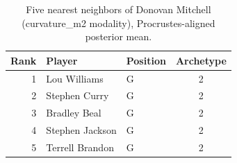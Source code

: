 \begin{table}[htbp]
  \centering\small
  \begin{tabular}{rllc}
    \toprule
    Rank & Player & Position & Archetype \\
    \midrule
    1 & Lou Williams & G & 2 \\
    2 & Stephen Curry & G & 2 \\
    3 & Bradley Beal & G & 2 \\
    4 & Stephen Jackson & G & 2 \\
    5 & Terrell Brandon & G & 2 \\
    \bottomrule
  \end{tabular}
  \caption{Five nearest neighbors of Donovan Mitchell (curvature_m2 modality), Procrustes-aligned posterior mean.}
  \label{tab:Donovan_Mitchell_neighbors_curvature_m2}
\end{table}

